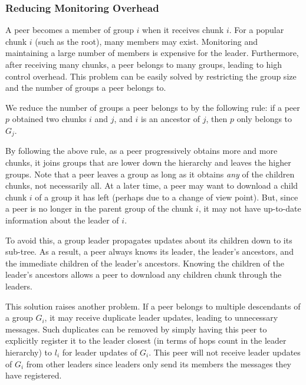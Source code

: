 \subsubsection{Reducing Monitoring Overhead}

    A peer becomes a member of group $i$ when it receives
    chunk $i$.  For a popular chunk $i$ (such as the root), 
    many members may exist.  Monitoring and maintaining 
    a large number of members is expensive for the leader.
    Furthermore, after receiving many chunks, a peer belongs
    to many groups, leading to high control overhead.
    This problem can be easily solved by restricting the 
    group size and the number of groups a peer belongs to.  

    We reduce the number of groups a peer belongs to by the 
    following rule: if a peer $p$ obtained two chunks $i$
    and $j$, and $i$ is an ancestor of $j$, then $p$ only
    belongs to $G_j$.  

    By following the above rule, as a peer progressively 
    obtains more and more chunks, it joins groups that are
    lower down the hierarchy and leaves the higher groups.
    Note that a peer leaves a group as long as it obtains
    \textit{any} of the children chunks, not necessarily
    all.  At a later time, a peer may want to download a 
    child chunk $i$ of a group it has left (perhaps due to 
    a change of view point).  But, since a peer is no 
    longer in the parent group of the chunk $i$, it may not
    have up-to-date information about the leader of $i$.

    To avoid this, a group leader propagates updates %
    about its children down to its sub-tree.  As a result,
    a peer always knows its leader, the leader's ancestors,
    and the immediate children of the leader's ancestors.
    Knowing the children of the leader's ancestors allows
    a peer to download any children chunk through the leaders.

    This solution raises another problem.  If a peer belongs
    to multiple descendants of a group $G_i$, it may receive
    duplicate leader updates, %
    leading to unnecessary messages.  
    Such duplicates can be removed by simply having
    this peer to explicitly register it to the leader closest
    (in terms of hops count in the
    leader hierarchy) to $l_i$ for leader updates of $G_i$.
    This peer will not receive leader updates of $G_i$ from other
    leaders since leaders only send its members the messages they have
    registered. %

